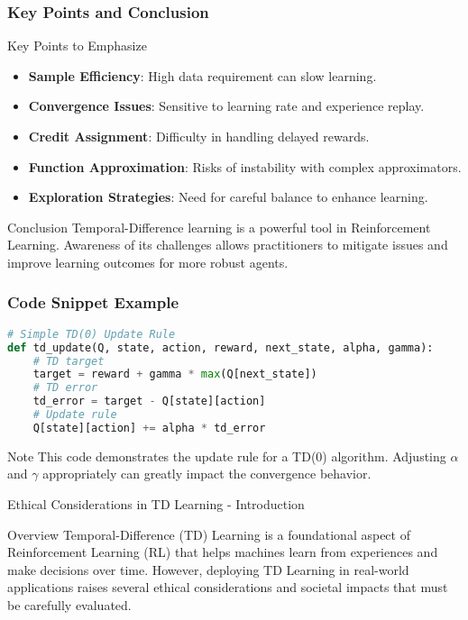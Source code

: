 \documentclass[aspectratio=169]{beamer}
\begin{document}
\begin{frame}[fragile]
    \frametitle{Key Points and Conclusion}
    \begin{block}{Key Points to Emphasize}
        \begin{itemize}
            \item \textbf{Sample Efficiency}: High data requirement can slow learning.
            \item \textbf{Convergence Issues}: Sensitive to learning rate and experience replay.
            \item \textbf{Credit Assignment}: Difficulty in handling delayed rewards.
            \item \textbf{Function Approximation}: Risks of instability with complex approximators.
            \item \textbf{Exploration Strategies}: Need for careful balance to enhance learning.
        \end{itemize}
    \end{block}

    \begin{block}{Conclusion}
        Temporal-Difference learning is a powerful tool in Reinforcement Learning. Awareness of its challenges allows practitioners to mitigate issues and improve learning outcomes for more robust agents.
    \end{block}
\end{frame}

\begin{frame}[fragile]
    \frametitle{Code Snippet Example}
    \begin{lstlisting}[language=Python]
# Simple TD(0) Update Rule
def td_update(Q, state, action, reward, next_state, alpha, gamma):
    # TD target
    target = reward + gamma * max(Q[next_state]) 
    # TD error
    td_error = target - Q[state][action]
    # Update rule
    Q[state][action] += alpha * td_error
    \end{lstlisting}
    \begin{block}{Note}
        This code demonstrates the update rule for a TD(0) algorithm. Adjusting $\alpha$ and $\gamma$ appropriately can greatly impact the convergence behavior.
    \end{block}
\end{frame}

\begin{frame}[fragile]{Ethical Considerations in TD Learning - Introduction}
    \begin{block}{Overview}
        Temporal-Difference (TD) Learning is a foundational aspect of Reinforcement Learning (RL) that helps machines learn from experiences and make decisions over time. However, deploying TD Learning in real-world applications raises several ethical considerations and societal impacts that must be carefully evaluated.
    \end{block}
\end{frame}
\end{document}
